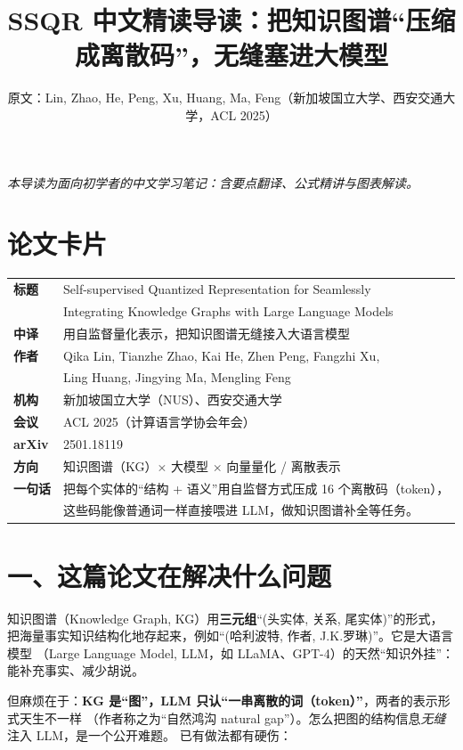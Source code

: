 \documentclass[11pt,UTF8,fontset=fandol]{ctexart}
\title{SSQR 中文精读导读：把知识图谱“压缩成离散码”，无缝塞进大模型}
\author{原文：Lin, Zhao, He, Peng, Xu, Huang, Ma, Feng（新加坡国立大学、西安交通大学，ACL 2025）}
\date{}
\begin{document}
\maketitle
\begin{center}\small\textit{本导读为面向初学者的中文学习笔记：含要点翻译、公式精讲与图表解读。}\end{center}

\section*{论文卡片}
\begin{center}
\begin{tabular}{@{}ll@{}}
\toprule
\textbf{标题} & Self-supervised Quantized Representation for Seamlessly \\
            & Integrating Knowledge Graphs with Large Language Models \\
\textbf{中译} & 用自监督量化表示，把知识图谱无缝接入大语言模型 \\
\textbf{作者} & Qika Lin, Tianzhe Zhao, Kai He, Zhen Peng, Fangzhi Xu, \\
            & Ling Huang, Jingying Ma, Mengling Feng \\
\textbf{机构} & 新加坡国立大学（NUS）、西安交通大学 \\
\textbf{会议} & ACL 2025（计算语言学协会年会） \\
\textbf{arXiv} & 2501.18119 \\
\textbf{方向} & 知识图谱（KG）$\times$ 大模型 $\times$ 向量量化 / 离散表示 \\
\textbf{一句话} & 把每个实体的“结构 + 语义”用自监督方式压成 16 个离散码（token），\\
              & 这些码能像普通词一样直接喂进 LLM，做知识图谱补全等任务。 \\
\bottomrule
\end{tabular}
\end{center}

\section{一、这篇论文在解决什么问题}

知识图谱（Knowledge Graph, KG）用\textbf{三元组}“(头实体, 关系, 尾实体)”的形式，
把海量事实知识结构化地存起来，例如“(哈利波特, 作者, J.K.罗琳)”。它是大语言模型
（Large Language Model, LLM，如 LLaMA、GPT-4）的天然“知识外挂”：能补充事实、减少胡说。

但麻烦在于：\textbf{KG 是“图”，LLM 只认“一串离散的词（token）”}，两者的表示形式天生不一样
（作者称之为“自然鸿沟 natural gap”）。怎么把图的结构信息\emph{无缝}注入 LLM，是一个公开难题。
已有做法都有硬伤：
\end{document}
